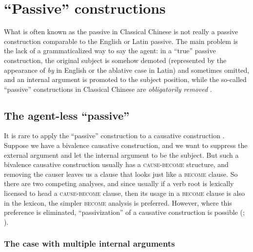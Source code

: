 \documentclass[UTF8, a4paper, oneside, scheme=plain, 12pt]{ctexrep}
\newcommand*{\citepage}[1]{p.~{#1}}
\newcommand*{\citepages}[1]{pp.~{#1}}
\newcommand{\form}[1]{\emph{#1}}
\newcommand*{\category}[1]{\textsc{#1}}
\begin{document}
\section{``Passive'' constructions}\label{sec:grammatical.clause.verbal.argument-structure.passive}

What is often known as the passive in Classical Chinese is not really a passive construction
comparable to the English or Latin passive.
The main problem is the lack of a grammaticalized way to say the agent:
in a ``true'' passive construction, the original subject is somehow demoted
(represented by the appearance of \form{by} in English or the ablative case in Latin)
and sometimes omitted, and an internal argument is promoted to the subject position,
while the so-called ``passive'' constructions in Classical Chinese
are \emph{obligatorily removed} \citep[\citepage{287-289}]{meiguang2018}.

\subsection{The agent-less ``passive''}\label{sec:grammatical.clause.verbal.argument-structure.pseudo-passive}

It is rare to apply the ``passive'' construction to a causative construction
\citep[\citepage{283}]{meiguang2018}.
Suppose we have a bivalence causative construction,
and we want to suppress the external argument and let the internal argument to be the subject.
But such a bivalence causative construction usually has a \category{cause}-\category{become} structure,
and removing the causer leaves us a clause that looks just like a \category{become} clause.
So there are two competing analyses,
and since usually if a verb root is lexically licensed to head a \category{cause}-\category{become} clause,
then its usage in a \category{become} clause is also in the lexicon,
the simpler \category{become} analysis is preferred.
However, where this preference is eliminated, ``passivization'' of a causative construction is possible 
(\citealt[\citepages{284,370-372}]{meiguang2018}; ).

\subsubsection{The case with multiple internal arguments}\label{sec:grammatical.clause.verbal.argument-structure.pseudo-passive.multiple-argument}
\end{document}
